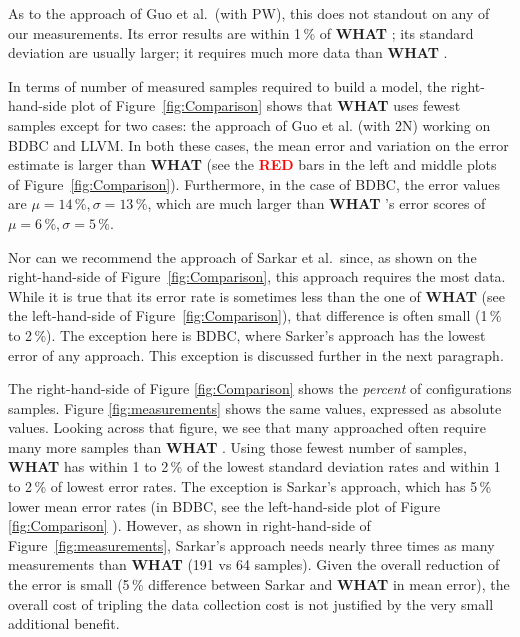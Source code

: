 \documentclass{sig-alternative}
\newcommand{\bi}{\begin{itemize}}%
\newcommand{\what}{{\bf WHAT }}
\begin{document}
As to the approach of Guo et al.\ (with PW), this   does not standout on any of
our measurements. Its error results are within 1\,\% of \what;
 its standard deviation are usually larger; it requires
 much more data than \what.
 
 In terms of number of measured samples required to build a model, 
 the right-hand-side plot of  Figure~\ref{fig:Comparison}  shows that
 \what uses fewest samples except for two cases:
 the approach of Guo et al. (with 2N) working on BDBC and LLVM.  In both these cases, the mean error and variation on the error
 estimate is   larger than \what  (see the \textcolor{red}{{\bf RED}} bars in the left and middle plots   of Figure~\ref{fig:Comparison}). Furthermore, in the case of BDBC, the error values
 are  $\mu=14\,\%, \sigma=13\,\%$, which are much larger
than \what's error scores of $\mu=6\,\%, \sigma=5\,\%$. 

Nor can we recommend the approach of Sarkar et al.\ since,
as shown on the right-hand-side of Figure~\ref{fig:Comparison}, 
this approach requires the most data.
While it is true that its error rate 
is sometimes less than the one of \what (see the left-hand-side of
Figure~\ref{fig:Comparison}), that difference is often small (1\,\%
to 2\,\%). The exception here is BDBC, where Sarker's approach has the lowest
error of any approach. This exception is discussed further in the
next paragraph.
 

The right-hand-side of Figure \ref{fig:Comparison}   shows
the {\em percent} of configurations samples. Figure \ref{fig:measurements} shows the same values,
expressed as absolute values. Looking across that figure,
we see that many approached often require many more samples than
\what.  Using those fewest number of samples, \what has
within 1 to 2\,\% of the lowest standard deviation rates 
and within 1 to 2\,\% of lowest error rates.
The exception is Sarkar's approach, which has 5\,\% lower mean error
rates (in BDBC, see the left-hand-side plot of Figure \ref{fig:Comparison} ).  However, 
as shown in right-hand-side of Figure~\ref{fig:measurements}, Sarkar's approach needs nearly three times
as many measurements than \what (191 vs 64 samples). Given
the overall reduction of the error is   small (5\,\% difference
between Sarkar and \what in mean error), the overall
cost of tripling the data collection cost is
not justified by the very small additional benefit. 


    
\end{document}
